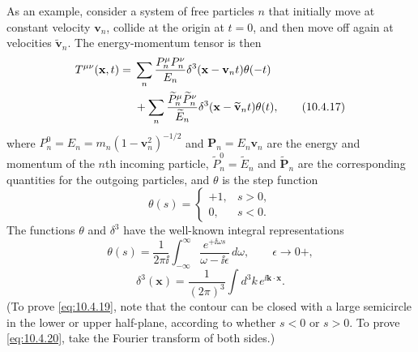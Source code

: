As an example, consider a system of free particles \(n\) that initially
move at constant velocity \(\mathbf{v}_n\), collide at the origin at
\(t=0\), and then move off again at velocities
\(\widetilde{\mathbf{v}}_n\). The energy-momentum tensor is then
\begin{align}
  T^{\mu\nu}(\mathbf{x},t)
  ={}&
  \sum_n\frac{P_n^\mu P_n^\nu}{E_n}
  \delta^3(\mathbf{x}-\mathbf{v}_nt)\theta(-t)
  \notag\\
  &+
  \sum_n\frac{\widetilde P_n^\mu\widetilde P_n^\nu}{\widetilde E_n}
  \delta^3(\mathbf{x}-\widetilde{\mathbf{v}}_nt)\theta(t),
  \tag{10.4.17}\label{eq:10.4.17}
\end{align}
where \(P_n^0=E_n=m_n(1-\mathbf{v}_n^2)^{-1/2}\) and
\(\mathbf{P}_n=E_n\mathbf{v}_n\) are the energy and momentum of the \(n\)th
incoming particle, \(\widetilde P_n^0=\widetilde E_n\) and
\(\widetilde{\mathbf{P}}_n\) are the corresponding quantities for the
outgoing particles, and \(\theta\) is the step function
\begin{equation}
  \theta(s)=
  \begin{cases}
  +1,&s>0,\\
  0,&s<0.
  \end{cases}
  \tag{10.4.18}\label{eq:10.4.18}
\end{equation}
The functions \(\theta\) and \(\delta^3\) have the well-known integral
representations
\begin{equation}
  \theta(s)
  =
  \frac{1}{2\pi\ii}
  \int_{-\infty}^{\infty}
  \frac{e^{+\ii\omega s}}{\omega-\ii\epsilon}\,d\omega,
  \qquad
  \epsilon\to0+,
  \tag{10.4.19}\label{eq:10.4.19}
\end{equation}
\begin{equation}
  \delta^3(\mathbf{x})
  =
  \frac{1}{(2\pi)^3}\int d^3k\,e^{\ii\mathbf{k}\cdot\mathbf{x}}.
  \tag{10.4.20}\label{eq:10.4.20}
\end{equation}
(To prove \eqref{eq:10.4.19}, note that the contour can be closed with a
large semicircle in the lower or upper half-plane, according to whether
\(s<0\) or \(s>0\). To prove \eqref{eq:10.4.20}, take the Fourier transform
of both sides.)


